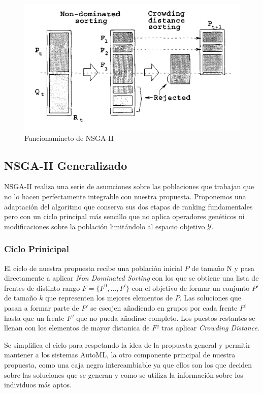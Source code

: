 \begin{figure}[ht]
    \centering
    \includegraphics[scale=0.5]{Pictures/nsga2.png}
    \caption{Funcionamineto de NSGA-II}
    \label{proposal:fig:nsga2}
\end{figure}

\subsection{NSGA-II Generalizado}

NSGA-II realiza una serie de asumciones sobre las poblaciones que trabajan que no lo hacen perfectamente integrable con nuestra propuesta. Proponemos una adaptaci\'on del algoritmo que conserva sus dos etapas de ranking fundamentales pero con un ciclo principal m\'as sencillo que no aplica operadores gen\'eticos ni modificaciones sobre la poblaci\'on limit\'andolo al espacio objetivo $\mathcal{Y}$.

\subsubsection{Ciclo Prinicipal}
El ciclo de nuestra propuesta recibe una poblaci\'on inicial $P$ de tama\~no N y pasa directamente a aplicar \textit{Non Dominated Sorting} con los que se obtiene una lista de frentes de distinto rango $F = \{F^0, ..., F^l\}$ con el objetivo de formar un conjunto $P'$ de tama\~no $k$ que representen los mejores elementos de $P$. Las soluciones que pasan a formar parte de $P'$ se escojen a\~nadiendo en grupos por cada frente $F^i$ hasta que un frente $F^q$ que no pueda a\~nadirse completo. Los puestos restantes se llenan con los elementos de mayor distanica de $F^q$ tras aplicar \textit{Crowding Distance}.

Se simplifica el ciclo para respetando la idea de la propuesta general y permitir mantener a los sistemas AutoML, la otro componente principal de nuestra propuesta, como una caja negra intercambiable ya que ellos son los que deciden sobre las soluciones que se generan y como se utiliza la informaci\'on sobre los individuos m\'as aptos.
